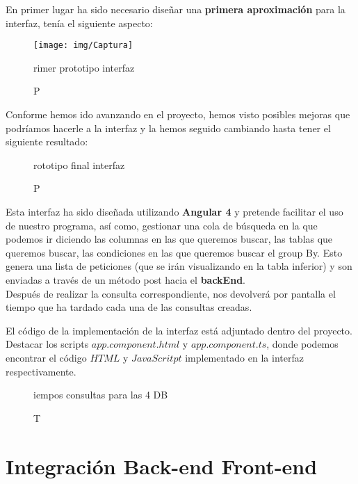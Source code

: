\documentclass[12pt,a4paper]{article}
\begin{document}
En primer lugar ha sido necesario diseñar una \textbf{primera aproximación} para la interfaz, tenía el siguiente aspecto:

\begin{figure}[!h]
\centering
\texttt{[image: img/Captura]}
\label{int1}
\caption Primer prototipo interfaz
\end{figure}


Conforme hemos ido avanzando en el proyecto, hemos visto posibles mejoras que podríamos hacerle a la interfaz y la hemos seguido cambiando hasta tener el siguiente resultado:

\begin{figure}[!h]
\centering
{}
\caption Prototipo final interfaz
\label{int2}
\end{figure}

Esta interfaz ha sido diseñada utilizando \textbf{Angular 4} y pretende facilitar el uso de nuestro programa, así como, gestionar una cola de búsqueda en la que podemos ir diciendo las columnas en las que queremos buscar, las tablas que queremos buscar, las condiciones en las que queremos buscar el group By. Esto genera una lista de peticiones (que se irán visualizando en la tabla inferior) y son enviadas a través de un método post hacia el \textbf{backEnd}. \\

Después de realizar la consulta correspondiente, nos devolverá por pantalla el tiempo que ha tardado cada una de las consultas creadas.

El código de la implementación de la interfaz está adjuntado dentro del proyecto. Destacar los scripts $app.component.html$ y $app.component.ts$, donde podemos encontrar el código $HTML$ y $JavaScritpt$ implementado en la interfaz respectivamente.\\

\begin{figure}[!h]
\centering
{}
\caption Tiempos consultas para las 4 DB
\label{int3}
\end{figure}


\newpage
\section{Integración Back-end Front-end} \label{pto8}
\end{document}
